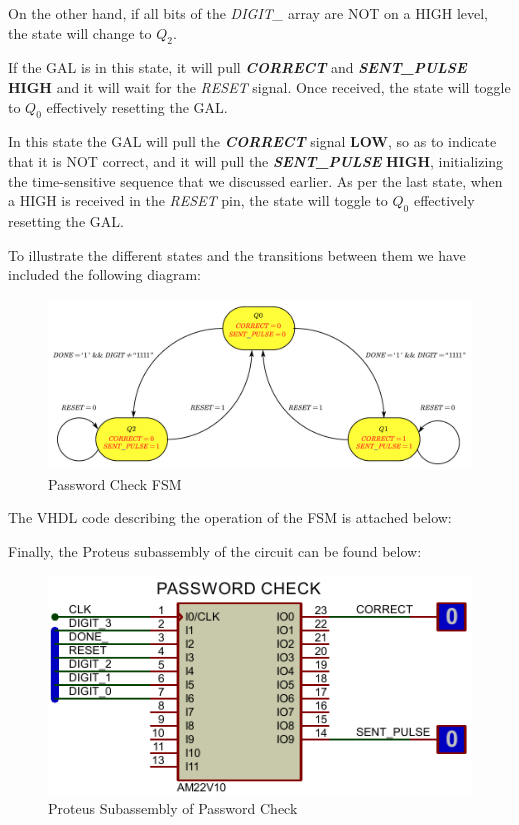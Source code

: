 On the other hand, if all bits of the \textit{DIGIT\_} array are NOT on a HIGH level, the state will change to \textit{$Q_2$}. 

\medskip
\medskip

If the GAL is in this state, it will pull \textbf{\textit{CORRECT}} and \textbf{\textit{SENT\_PULSE}} \textbf{HIGH} and it will wait for the \textit{RESET} signal. Once received, the state will toggle to \textit{$Q_0$} effectively resetting the GAL.

\medskip
\medskip

In this state the GAL will pull the \textbf{\textit{CORRECT}} signal \textbf{LOW}, so as to indicate that it is NOT correct, and it will pull the \textbf{\textit{SENT\_PULSE}} \textbf{HIGH}, initializing the time-sensitive sequence that we discussed earlier. As per the last state, when a HIGH is received in the \textit{RESET} pin, the state will toggle to \textit{$Q_0$} effectively resetting the GAL.

\clearpage

To illustrate the different states and the transitions between them we have included the following diagram:

\begin{figure}[H]
    \centering
    \includegraphics[scale = 0.55]{Graphics/PASSWORD CHECK/PASSWORD_CHECK_FSM.pdf}
    \caption{Password Check FSM}
    \label{fig:PASSWORD_CHECK_FSM}
\end{figure}

\vspace{0.5cm}

The VHDL code describing the operation of the FSM is attached below:


Finally, the Proteus subassembly of the circuit can be found below:

\begin{figure}[H]
    \centering
    \includegraphics[scale = 1]{Graphics/PASSWORD CHECK/PASSWORD_CHECK_PROTEUS.PDF}
    \caption{Proteus Subassembly of Password Check}
    \label{fig:PASSWORD_CHECK_PROTEUS}
\end{figure}